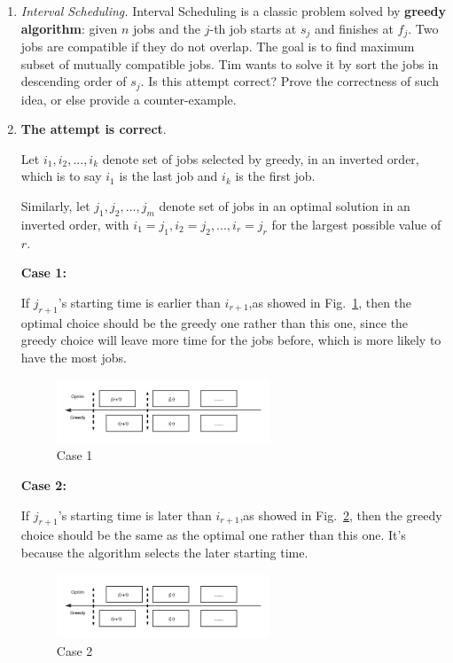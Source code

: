 \documentclass[12pt,a4paper]{article}
\makeatletter
\newtheorem*{solution}{Solution}
\theoremstyle{definition}
\renewenvironment{solution}[1][Solution] {\par\pushQED{\qed}\normalfont\topsep6\p@\@plus6\p@\relax\trivlist\item[\hskip\labelsep\bfseries#1\@addpunct{.}]\ignorespaces}{\popQED\endtrivlist\@endpefalse} \makeatother
\makeatother
\begin{document}
\begin{enumerate}
	\item \textit{Interval Scheduling.} Interval Scheduling is a classic problem solved by \textbf{greedy algorithm}: given $n$ jobs and the $j$-th job starts at $s_j$ and finishes at $f_j$. Two jobs are compatible if they do not overlap. The goal is to find maximum subset of mutually compatible jobs. Tim wants to solve it by sort the jobs in descending order of $s_j$. Is this attempt correct? Prove the correctness of such idea, or else provide a counter-example.

\begin{solution}

\textbf{The attempt is correct}.

Let $i_1,i_2, ...,i_k$ denote set of jobs selected by greedy, in an inverted order, which is to say $i_1$ is the last job and $i_k$ is the first job.

Similarly, let $j_1, j_2,...,j_m$ denote set of jobs in an optimal solution in an inverted order, with $i_1 = j_1, i_2=j_2,...,i_r=j_r$ for the largest possible value of $r$.

\textbf{Case 1:}

If $j_{r+1}$'s starting time is earlier than $i_{r+1}$,as showed in Fig.~\ref{case1}, then the optimal  choice should be the greedy one rather than this one, since the greedy choice will leave more time for the jobs before, which is more likely to have the most jobs. 

\begin{figure}[htbp]
    \centering
    \includegraphics[width=0.6\textwidth]{case1.png}
    \caption{Case 1}\label{case1}
\end{figure}

\textbf{Case 2:}

If $j_{r+1}$'s starting time is later than $i_{r+1}$,as showed in Fig.~\ref{case2}, then the greedy choice should be the same as the optimal one rather than this one. It's because the algorithm selects the later starting time.

\begin{figure}[htbp]
    \centering
    \includegraphics[width=0.6\textwidth]{case2.png}
    \caption{Case 2}\label{case2}
\end{figure}
\end{solution}


\end{enumerate}
\end{document}
